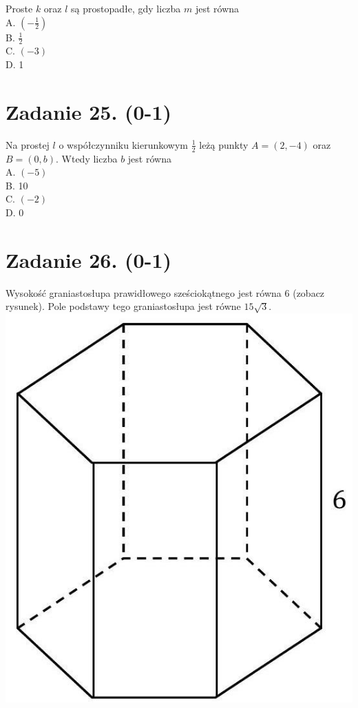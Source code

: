 \documentclass[10pt]{article}
\begin{document}
Proste \(k\) oraz \(l\) są prostopadłe, gdy liczba \(m\) jest równa\\
A. \(\left(-\frac{1}{2}\right)\)\\
B. \(\frac{1}{2}\)\\
C. \((-3)\)\\
D. 1

\section*{Zadanie 25. (0-1)}
Na prostej \(l\) o współczynniku kierunkowym \(\frac{1}{2}\) leżą punkty \(A=(2,-4)\) oraz \(B=(0, b)\). Wtedy liczba \(b\) jest równa\\
A. \((-5)\)\\
B. 10\\
C. \((-2)\)\\
D. 0

\section*{Zadanie 26. (0-1)}
Wysokość graniastosłupa prawidłowego sześciokątnego jest równa 6 (zobacz rysunek). Pole podstawy tego graniastosłupa jest równe \(15 \sqrt{3}\).\\
\includegraphics[max width=\textwidth, center]{2024_11_21_0a35d272448d5080a489g-18}
\end{document}
